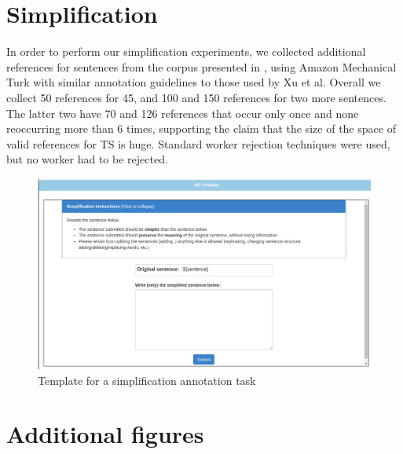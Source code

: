 \documentclass[letterpaper, 11pt]{article}
\begin{document}
\section{Simplification}
In order to perform our simplification experiments, 
we collected additional references for sentences from the corpus presented in , using Amazon
Mechanical Turk with similar annotation guidelines to those used by Xu et al. 
Overall we collect 50 references for 45, and 100 and 150 references for two more sentences.
The latter two have 70 and 126 references that occur only once and none reoccurring more than 6 times, 
supporting the claim that the size of the space of valid references for TS is huge.
Standard worker rejection techniques were used, but no worker had to be rejected.

\begin{figure}[h!]
	\includegraphics[width=0.9\columnwidth]{simplification_task}
	\caption{Template for a simplification annotation task} 
\end{figure}
\FloatBarrier
\section{Additional figures}
\end{document}
